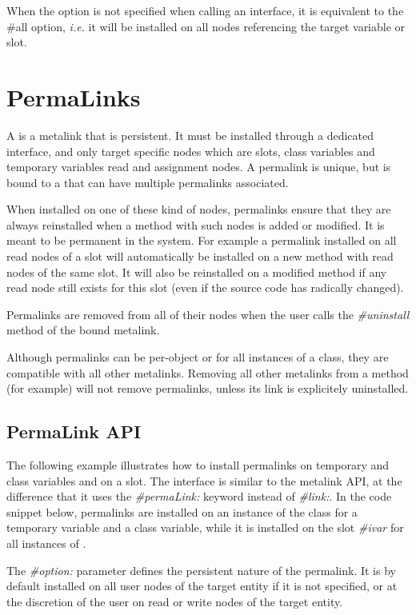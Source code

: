 \documentclass[10pt,twoside,english]{_support/latex/sbabook/sbabook}
\begin{document}
When the option is not specified when calling an interface, it is equivalent to the \#all option, \textit{i.e.} it will be installed on all nodes referencing the target variable or slot.
\section{PermaLinks}
A  is a metalink that is persistent. It must be installed through a dedicated interface, and only target specific nodes which are slots, class variables and temporary variables read and assignment nodes. A permalink is unique, but is bound to a  that can have multiple permalinks associated.

When installed on one of these kind of nodes, permalinks ensure that they are always reinstalled when a method with such nodes is added or modified. It is meant to be permanent in the system. For example a permalink installed on all read nodes of a slot will automatically be installed on a new method with read nodes of the same slot. It will also be reinstalled on a modified method if any read node still exists for this slot (even if the source code has radically changed).

Permalinks are removed from all of their nodes when the user calls the \textit{\#uninstall} method of the bound metalink.

Although permalinks can be per-object or for all instances of a class, they are compatible with all other metalinks. Removing all other metalinks from a method (for example) will not remove permalinks, unless its link is explicitely uninstalled.
\subsection{PermaLink API}
The following example illustrates how to install permalinks on temporary and class variables and on a slot. The interface is similar to the metalink API, at the difference that it uses the \textit{\#permaLink:} keyword instead of \textit{\#link:}. In the code snippet below, permalinks are installed on an instance of the  class for a temporary variable and a class variable, while it is installed on the slot \textit{\#ivar} for all instances of .

The \textit{\#option:} parameter defines the persistent nature of the permalink. It is by default installed on all user nodes of the target entity if it is not specified, or at the discretion of the user on read or write nodes of the target entity.
\end{document}
